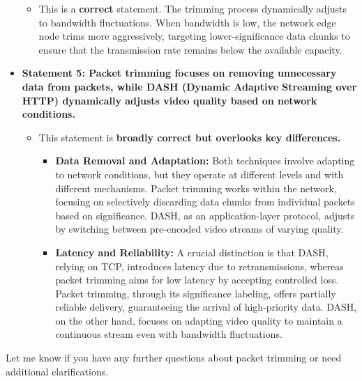 \documentclass[
]{article}
\begin{document}
\begin{itemize}
  \begin{itemize}
  
  \item
    This is a \textbf{correct} statement. The trimming process
    dynamically adjusts to bandwidth fluctuations. When bandwidth is
    low, the network edge node trims more aggressively, targeting
    lower-significance data chunks to ensure that the transmission rate
    remains below the available capacity.
  \end{itemize}
\item
  \textbf{Statement 5: Packet trimming focuses on removing unnecessary
  data from packets, while DASH (Dynamic Adaptive Streaming over HTTP)
  dynamically adjusts video quality based on network conditions.}

  \begin{itemize}
  
  \item
    This statement is \textbf{broadly correct but overlooks key
    differences.}

    \begin{itemize}
    
    \item
      \textbf{Data Removal and Adaptation:} Both techniques involve
      adapting to network conditions, but they operate at different
      levels and with different mechanisms. Packet trimming works within
      the network, focusing on selectively discarding data chunks from
      individual packets based on significance. DASH, as an
      application-layer protocol, adjusts by switching between
      pre-encoded video streams of varying quality.
    \item
      \textbf{Latency and Reliability:} A crucial distinction is that
      DASH, relying on TCP, introduces latency due to retransmissions,
      whereas packet trimming aims for low latency by accepting
      controlled loss. Packet trimming, through its significance
      labeling, offers partially reliable delivery, guaranteeing the
      arrival of high-priority data. DASH, on the other hand, focuses on
      adapting video quality to maintain a continuous stream even with
      bandwidth fluctuations.
    \end{itemize}
  \end{itemize}
\end{itemize}

Let me know if you have any further questions about packet trimming or
need additional clarifications.
\end{document}
